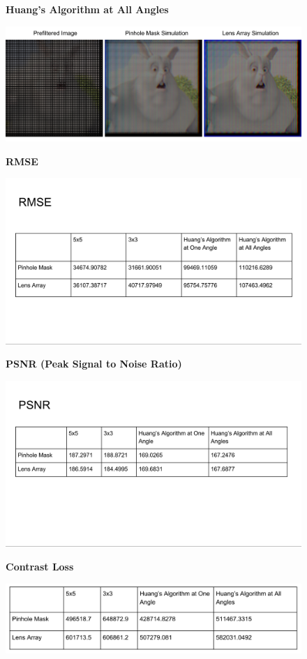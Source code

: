 \begin{figure}
    \centering
    \textbf{Huang's Algorithm at All Angles}\par\medskip
    \includegraphics[width=6in]{chapters/chapter9/images/Huang_all_angle.png}
\end{figure}

\begin{figure}
    \centering
    \textbf{RMSE}\par\medskip
    \includegraphics[width=6in]{chapters/chapter9/images/RMSE.png}
\end{figure}

\begin{figure}
    \centering
    \textbf{PSNR (Peak Signal to Noise Ratio)}\par\medskip
    \includegraphics[width=6in]{chapters/chapter9/images/PSNR.png}
\end{figure}

\begin{figure}
    \centering
    \textbf{Contrast Loss}\par\medskip
    \includegraphics[width=\columnwidth]{chapters/chapter9/images/Contrast_Loss.png}
\end{figure}
